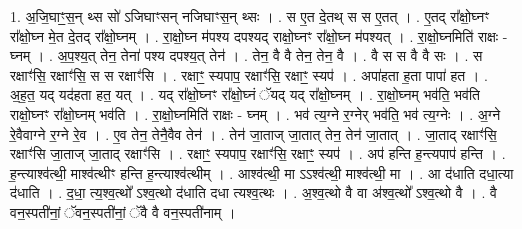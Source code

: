 \documentclass[17pt]{extarticle}
\begin{document}
1. अ॒जि॒घाꣳ॒॒स॒न् थ्स सो॑ ऽजिघाꣳसन् नजिघाꣳस॒न् थ्सः । . स ए॒त दे॒तथ् स स ए॒तत् । . ए॒तद् रा᳚क्षो॒घ्नꣳ रा᳚क्षो॒घ्न मे॒त दे॒तद् रा᳚क्षो॒घ्नम् । . रा॒क्षो॒घ्न म॑पश्य दपश्यद् राक्षो॒घ्नꣳ रा᳚क्षो॒घ्न म॑पश्यत् । . रा॒क्षो॒घ्नमिति॑ राक्षः - घ्नम् । . अ॒प॒श्य॒त् तेन॒ तेना॑ पश्य दपश्य॒त् तेन॑ । . तेन॒ वै वै तेन॒ तेन॒ वै । . वै स स वै वै सः । . स रक्षाꣳ॑सि॒ रक्षाꣳ॑सि॒ स स रक्षाꣳ॑सि । . रक्षाꣳ॒॒ स्यपाप॒ रक्षाꣳ॑सि॒ रक्षाꣳ॒॒ स्यप॑ । . अपा॑हता ह॒ता पापा॑ हत । . अ॒ह॒त॒ यद् यद॑हता हत॒ यत् । . यद् रा᳚क्षो॒घ्नꣳ रा᳚क्षो॒घ्नं ॅयद् यद् रा᳚क्षो॒घ्नम् । . रा॒क्षो॒घ्नम् भव॑ति॒ भव॑ति राक्षो॒घ्नꣳ रा᳚क्षो॒घ्नम् भव॑ति । . रा॒क्षो॒घ्नमिति॑ राक्षः - घ्नम् । . भव॑ त्य॒ग्ने र॒ग्नेर् भव॑ति॒ भव॑ त्य॒ग्नेः । . अ॒ग्ने रे॒वैवाग्ने र॒ग्ने रे॒व । . ए॒व तेन॒ तेनै॒वैव तेन॑ । . तेन॑ जा॒ताज् जा॒तात् तेन॒ तेन॑ जा॒तात् । . जा॒ताद् रक्षाꣳ॑सि॒ रक्षाꣳ॑सि जा॒ताज् जा॒ताद् रक्षाꣳ॑सि । . रक्षाꣳ॒॒ स्यपाप॒ रक्षाꣳ॑सि॒ रक्षाꣳ॒॒ स्यप॑ । . अप॑ हन्ति ह॒न्त्यपाप॑ हन्ति । . ह॒न्त्याश्व॑त्थी॒ माश्व॑त्थीꣳ हन्ति ह॒न्त्याश्व॑त्थीम् । . आश्व॑त्थी॒ मा ऽऽश्व॑त्थी॒ माश्व॑त्थी॒ मा । . आ द॑धाति दधा॒त्या द॑धाति । . द॒धा॒ त्य॒श्व॒त्थो᳚ ऽश्व॒त्थो द॑धाति दधा त्यश्व॒त्थः । . अ॒श्व॒त्थो वै वा अ॑श्व॒त्थो᳚ ऽश्व॒त्थो वै । . वै वन॒स्पती॑नां॒ ॅवन॒स्पती॑नां॒ ॅवै वै वन॒स्पती॑नाम् । \newline
\end{document}

